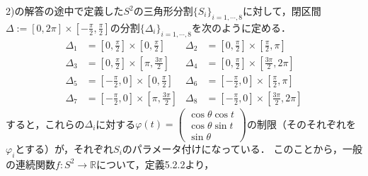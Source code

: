 \documentclass[dvipdfmx,nosetpagesize, uplatex]{jsarticle}
\theoremstyle{definition}
\theoremstyle{StatementsWithStar}
\theoremstyle{StatementsWithStar2}
\theoremstyle{StatementsWithStar3}
\theoremstyle{StatementsWithCCirc}
\theoremstyle{definition}
\begin{document}
2)の解答の途中で定義した$S^2$の三角形分割$\{S_i\}_{i=1,\cdots,8}$に対して，閉区間$\Delta:=[0,2\pi]\times \left[-\frac{\pi}{2},\frac{\pi}{2}\right]$の分割$\{\Delta_i\}_{i=1,\cdots,8}$を次のように定める．
\begin{align*}
    \Delta_1 &= \left[0,\frac{\pi}{2}\right] \times \left[0,\frac{\pi}{2}\right] &
    \Delta_2 &= \left[0,\frac{\pi}{2}\right] \times \left[\frac{\pi}{2},\pi\right]\\
    \Delta_3 &= \left[0,\frac{\pi}{2}\right] \times \left[\pi,\frac{3\pi}{2}\right] &
    \Delta_4 &= \left[0,\frac{\pi}{2}\right] \times \left[\frac{3\pi}{2},2\pi\right]\\
    \Delta_5 &= \left[-\frac{\pi}{2},0\right] \times \left[0,\frac{\pi}{2}\right] &
    \Delta_6 &= \left[-\frac{\pi}{2},0\right] \times \left[\frac{\pi}{2},\pi\right]\\
    \Delta_7 &= \left[-\frac{\pi}{2},0\right] \times \left[\pi,\frac{3\pi}{2}\right] &
    \Delta_8 &= \left[-\frac{\pi}{2},0\right] \times \left[\frac{3\pi}{2},2\pi\right]
\end{align*}
すると，これらの$\Delta_i$に対する$\varphi(t)=\left(\begin{array}{c}\cos\theta\cos t \\ \cos\theta\sin t \\ \sin\theta\end{array}\right)$の制限（そのそれぞれを$\varphi_i$とする）が，それぞれ$S_i$のパラメータ付けになっている．
このことから，一般の連続関数$f:S^2\to\mathbb{R}$について，定義5.2.2より，
\end{document}
